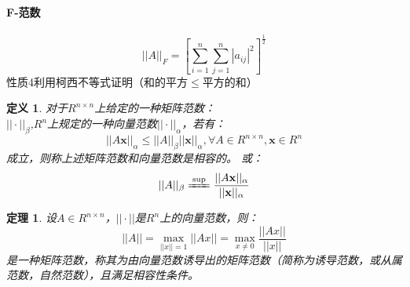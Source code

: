 \documentclass[a4paper]{article}
\newtheorem{definition}{定义}[section]
\newtheorem{theorem}{定理}[section]
\begin{document}
\paragraph{F-范数}
$$||A||_F=[\sum^n_{i=1}\sum^n_{j=1}|a_{ij}|^2]^\frac{1}{2}$$
性质4利用柯西不等式证明（和的平方$\le$平方的和）

\begin{definition}
对于$R^{n\times n}$上给定的一种矩阵范数：\\
$||\cdot||_{\beta}$,$R^n$上规定的一种向量范数$||\cdot||_\alpha $，若有：
\begin{equation}
||A\mathbf{x} ||_\alpha \le ||A||_\beta ||\mathbf{x} ||_\alpha, \forall A \in R^{n\times n}, \mathbf{x} \in R^{n}
\end{equation}
成立，则称上述矩阵范数和向量范数是相容的。
或：
\begin{equation}
||A||_\beta \xlongequal[]{\sup} \frac{||A\mathbf{x} ||_\alpha}{||\mathbf{x}||_\alpha}
\end{equation}
\end{definition}

\begin{theorem}
设$A\in R^{n\times n}$，$||\cdot||$是$R^n$上的向量范数，则：
\begin{equation}
||A||=\max_{||x||=1}||Ax||=\max_{x \neq 0}\frac{||Ax||}{||x||}
\label{eq_natnorm}
\end{equation}
是一种矩阵范数，称其为由向量范数诱导出的矩阵范数（简称为诱导范数，或从属范数，自然范数），且满足相容性条件。
\label{theorem_natnorm}
\end{theorem}
\end{document}
